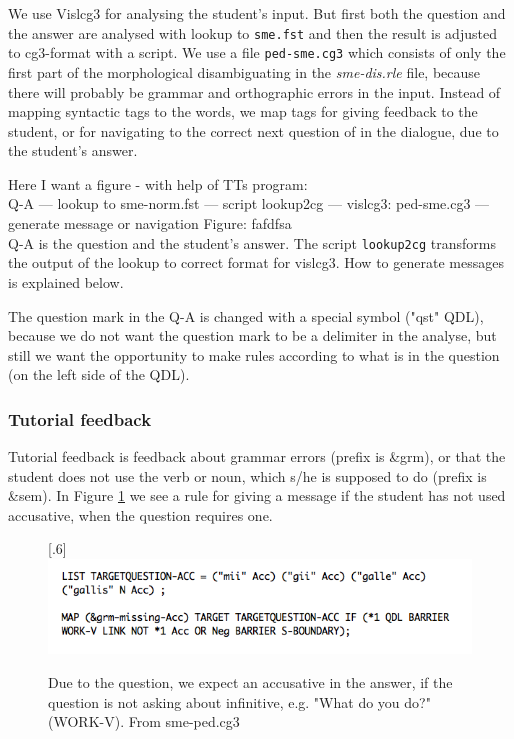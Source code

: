 \documentclass[a4paper,12pt]{article}
\begin{document}
We use Vislcg3 for analysing the student's input. But first both the question and the answer are analysed with lookup to \texttt{sme.fst} and then the result is adjusted to cg3-format with a script. We use a file \texttt{ped-sme.cg3} which consists of only the first part of the morphological disambiguating in the \textit{sme-dis.rle} file, because there will probably be grammar and orthographic errors in the input. Instead of mapping syntactic tags to the words, we map tags for giving feedback to the student, or for navigating to the correct next question of in the dialogue, due to the student's answer.

Here I want a figure - with help of TTs program:\\
Q-A --- lookup to sme-norm.fst --- script lookup2cg --- vislcg3: ped-sme.cg3 --- generate message or navigation
Figure: fafdfsa\\

Q-A is the question and the student's answer. The script \texttt{lookup2cg} transforms the output of the lookup to correct format for vislcg3. How to generate messages is explained below.

The question mark in the Q-A is changed with a special symbol ("qst" QDL), because we do not want the question mark to be a delimiter in the analyse, but still we want the opportunity to make rules according to what is in the question (on the left side of the QDL).


\subsubsection{Tutorial feedback}
Tutorial feedback is feedback about grammar errors (prefix is \&grm), or that the student does not use the verb or noun, which s/he is supposed to do (prefix is \&sem). In Figure \ref{cg3} we see a rule for giving a message if the student has not used accusative, when the question requires one. 

\begin{figure}[htbp]
\begin{center}
\scalebox{.6}[.6]{\includegraphics{img/pedcg3.png}}
\caption{Due to the question, we expect an accusative in the answer, if the question is not asking about infinitive, e.g. "What do you do?" (WORK-V). From sme-ped.cg3}
\label{cg3}
\end{center}
\end{figure}
\end{document}
